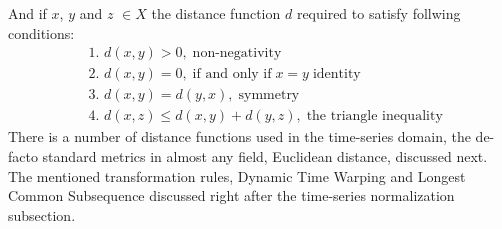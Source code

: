 And if $x$, $y$ and $z$ $\in X$ the distance function $d$ required to satisfy follwing conditions:
\begin{align}
 & \text{1. } d(x, y) > 0, \; \text{non-negativity} \label{eq:d1} \\
 & \text{2. } d(x, y) = 0, \; \text{if and only if} \; x = y  \;  \text{identity} \\
 & \text{3. } d(x, y) = d(y, x), \; \text{symmetry} \\
 & \text{4. } d(x, z) \leq d(x, y) + d(y, z), \; \text{the triangle inequality} \label{eq:d4}
\end{align}
There is a number of distance functions used in the time-series domain, the de-facto standard metrics in almost any field, Euclidean distance, discussed next. The mentioned transformation rules, Dynamic Time Warping and Longest Common Subsequence discussed right after the time-series normalization subsection.
